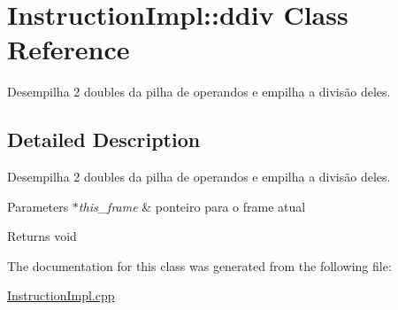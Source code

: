 \hypertarget{class_instruction_impl_1_1ddiv}{}\section{Instruction\+Impl\+:\+:ddiv Class Reference}
\label{class_instruction_impl_1_1ddiv}


Desempilha 2 doubles da pilha de operandos e empilha a divisão deles.  




\subsection{Detailed Description}
Desempilha 2 doubles da pilha de operandos e empilha a divisão deles. 


\begin{DoxyParams}{Parameters}
{\em $\ast$this\+\_\+frame} & ponteiro para o frame atual \\
\hline
\end{DoxyParams}
\begin{DoxyReturn}{Returns}
void 
\end{DoxyReturn}


The documentation for this class was generated from the following file\+:\begin{DoxyCompactItemize}
\item 
\hyperlink{_instruction_impl_8cpp}{Instruction\+Impl.\+cpp}\end{DoxyCompactItemize}
